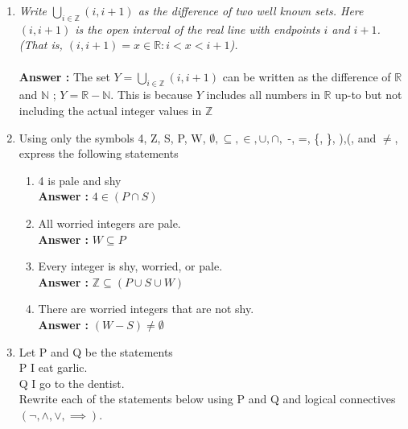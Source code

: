 \documentclass[a4paper,11pt]{article}
\begin{document}
\begin{enumerate}

\item \emph{Write $ \bigcup_{i\in \mathbb{Z}} (i, i+1)$ as the difference of two well known sets. Here $(i, i+1)$ is the open interval of the real line with endpoints $i$ and $i + 1$. (That is, $(i, i + 1) = {x \in \mathbb{R} : i < x < i + 1}$).} \\ \\
\textbf{Answer :} The set $Y = \bigcup_{i\in \mathbb{Z}} (i, i+1)$ can be written as the difference of $\mathbb{R}$ and $\mathbb{N}$ ; $Y = \mathbb{R}-\mathbb{N} $. This is because $Y$ includes all numbers in $\mathbb{R}$ up-to but not including the actual integer values in $\mathbb{Z}$



\item Using only the symbols 4, Z, S, P, W, $\emptyset, \subseteq, \in, \cup, \cap,$ -, =, \{, \}, ),(, and $\neq$, express the following
statements
  
  \begin{enumerate}
  	\item 4 is pale and shy \\
  	\textbf{Answer :} $4 \in (P \cap S)$
  	\item All worried integers are pale. \\
  	\textbf{Answer :} $W \subseteq P$
  	\item Every integer is shy, worried, or pale. \\
  	\textbf{Answer :} $\mathbb{Z} \subseteq (P \cup S \cup W)$
  	\item There are worried integers that are not shy. \\
  	\textbf{Answer :} $(W - S) \neq \emptyset$
  \end{enumerate}



\item Let P and Q be the statements \\ P I eat garlic. \\ Q I go to the dentist. \\
Rewrite each of the statements below using P and Q and logical connectives $(\neg, \wedge, \vee, \implies)$.


\end{enumerate}
\end{document}
